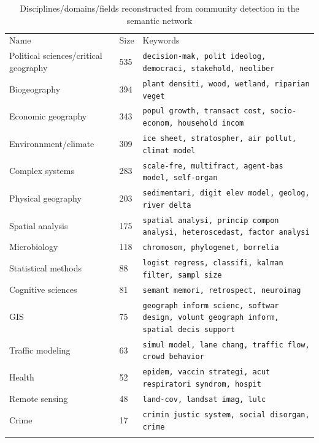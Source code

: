 \begin{table}
\caption{Disciplines/domains/fields reconstructed from community detection in the semantic network}
\label{tab:domains}
\hspace{-2cm}
\begin{tabular}{lll}
\hline\noalign{\smallskip}
Name & Size & Keywords  \\
\noalign{\smallskip}\hline\noalign{\smallskip}
Political sciences/critical geography & 535 & \texttt{decision-mak, polit ideolog, democraci, stakehold, neoliber} \\
Biogeography & 394 & \texttt{plant densiti, wood, wetland, riparian veget} \\
Economic geography & 343 &  \texttt{popul growth, transact cost, socio-econom, household incom} \\
Environnment/climate & 309 & \texttt{ice sheet, stratospher, air pollut, climat model} \\
Complex systems & 283 & \texttt{scale-fre, multifract, agent-bas model, self-organ} \\
Physical geography & 203 & \texttt{sedimentari, digit elev model, geolog, river delta} \\
Spatial analysis & 175 & \texttt{spatial analysi, princip compon analysi, heteroscedast, factor analysi} \\
Microbiology & 118 & \texttt{chromosom, phylogenet, borrelia} \\
Statistical methods & 88 & \texttt{logist regress, classifi, kalman filter, sampl size} \\
Cognitive sciences & 81 & \texttt{semant memori, retrospect, neuroimag} \\
GIS & 75 & \texttt{geograph inform scienc, softwar design, volunt geograph inform, spatial decis support} \\
Traffic modeling & 63 & \texttt{simul model, lane chang, traffic flow, crowd behavior} \\
Health & 52 & \texttt{epidem, vaccin strategi, acut respiratori syndrom, hospit} \\
Remote sensing & 48 & \texttt{land-cov, landsat imag, lulc} \\
Crime & 17 & \texttt{crimin justic system, social disorgan, crime} \\
\noalign{\smallskip}\hline
\end{tabular}
\end{table}





